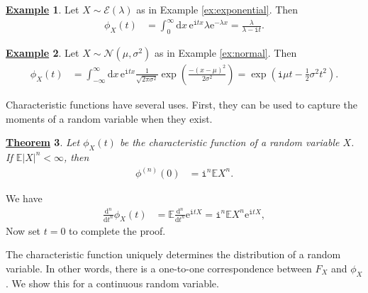 \documentclass[12pt]{book}
\numberwithin{equation}{chapter}
\theoremstyle{plain}
\newtheorem{theorem}{\underline{Theorem}}
\numberwithin{theorem}{section}
\theoremstyle{definition}
\newtheorem{example}[theorem]{\underline{Example}}
\numberwithin{exercise}{chapter}
\let\oldendproof\endproof
\renewenvironment{proof}[1][\proofname]{%
  \oldproof[\scshape\underline{#1}]%
}{\oldendproof}
\newcommand{\<}{\langle}
\renewcommand{\>}{\rangle}
\renewcommand{\(}{\left(}
\renewcommand{\)}{\right)}
\renewcommand{\[}{\left[}
\renewcommand{\]}{\right]}
\newcommand\Eb{\mathds{E}}
\newcommand\Ec{\mathscr{E}}
\newcommand\Nc{\mathscr{N}}
\newcommand\sig{\sigma}
\newcommand\lam{\lambda}
\newcommand\ii{\mathtt{i}}
\newcommand\dd{\mathrm{d}}
\newcommand\ee{\mathrm{e}}
\begin{document}
\begin{example}
\label{ex:char.exp}
Let $X \sim \Ec(\lam)$ as in Example \ref{ex:exponential}.  Then
\begin{align}
\phi_X(t)
	&=	\int_0^\infty \dd x \, \ee^{\ii t x} \lam \ee^{-\lam x}
	=		\frac{\lam}{\lam-\ii t} .
\end{align}
\end{example}

\begin{example}
\label{ex:char.normal}
Let $X \sim \Nc(\mu,\sig^2)$ as in Example \ref{ex:normal}.  Then
\begin{align}
\phi_X(t)
	&=	\int_{-\infty}^\infty \dd x \, \ee^{\ii t x} \frac{1}{\sqrt{2 \pi \sig^2}} \exp\( \frac{-(x-\mu)^2}{2 \sig^2} \)
	=		\exp\( \ii \mu t - \frac{1}{2} \sig^2 t^2 \) .
\end{align}
\end{example}

\noindent
Characteristic functions have several uses.  First, they can be used to capture the moments of a random variable when they exist.

\begin{theorem}
Let $\phi_X(t)$ be the characteristic function of a random variable $X$.  If $\Eb |X|^n < \infty$, then
\begin{align}
\phi^{(n)}(0)
	&=	\ii^n \Eb X^n .
\end{align}
\end{theorem}
\begin{proof}
We have
\begin{align}
\frac{\dd^n}{\dd t^n} \phi_X(t)
	&=	\Eb \frac{\dd^n}{\dd t^n} \ee^{\ii t X}
	=		\ii^n \Eb X^n \ee^{\ii t X} ,
\end{align}
Now set $t=0$ to complete the proof.
\end{proof}

\noindent
The characteristic function uniquely determines the distribution of a random variable.  In other words, there is a one-to-one correspondence between $F_X$ and $\phi_X$.  We show this for a continuous random variable.
\end{document}
